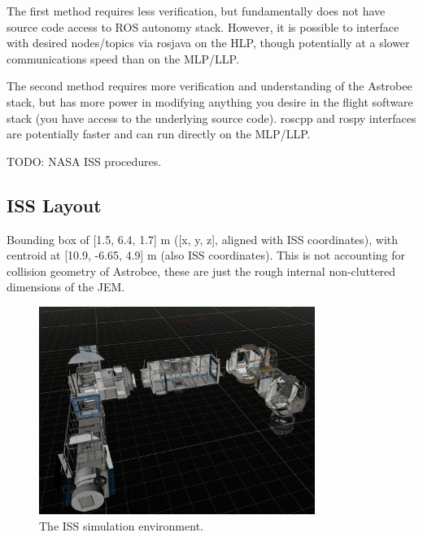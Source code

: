 \documentclass{article}
\begin{document}
The first method requires less verification, but fundamentally does not have source code access to ROS autonomy stack. However, it is possible to interface with desired nodes/topics via rosjava on the HLP, though potentially at a slower communications speed than on the MLP/LLP.

The second method requires more verification and understanding of the Astrobee stack, but has more power in modifying anything you desire in the flight software stack (you have access to the underlying source code). roscpp and rospy interfaces are potentially faster and can run directly on the MLP/LLP.

TODO: NASA ISS procedures.

\subsection{ISS Layout}

Bounding box of [1.5, 6.4, 1.7] m ([x, y, z], aligned with ISS coordinates), with centroid at [10.9, -6.65, 4.9] m (also ISS coordinates). This is not accounting for collision geometry of Astrobee, these are just the rough internal non-cluttered dimensions of the JEM.

\begin{figure}[h!]
	\centering
	\includegraphics[width=0.8\textwidth]{img/ISS_env.jpg}
	\caption{The ISS simulation environment.}
\end{figure}
\end{document}
